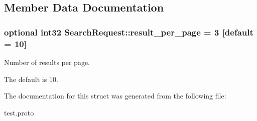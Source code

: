\subsection{Member Data Documentation}
\subsubsection[{\texorpdfstring{result\+\_\+per\+\_\+page}{result_per_page}}]{\setlength{\rightskip}{0pt plus 5cm}optional int32 Search\+Request\+::result\+\_\+per\+\_\+page = 3 \mbox{[}default = 10\mbox{]}}\hypertarget{structSearchRequest_a40e02a2779af41f8bf5f7127665bd1a8}{}\label{structSearchRequest_a40e02a2779af41f8bf5f7127665bd1a8}


Number of results per page. 

The default is 10. 

The documentation for this struct was generated from the following file\+:\begin{DoxyCompactItemize}
\item 
test.\+proto\end{DoxyCompactItemize}
